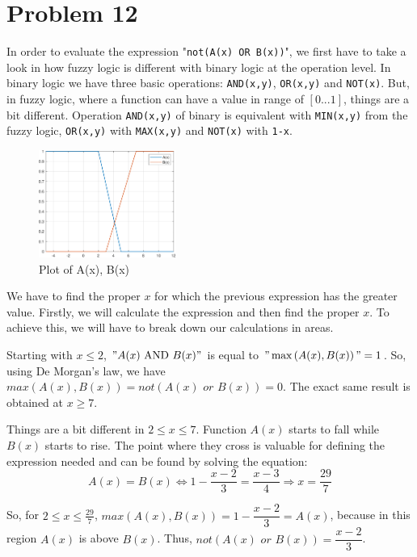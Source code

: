 \section{Problem 12}

In order to evaluate the expression "\verb|not(A(x) OR B(x))|", we first have to take a look in how fuzzy logic is different with binary logic at the operation level.
In binary logic we have three basic operations: \verb*|AND(x,y)|, \verb*|OR(x,y)| and \verb*|NOT(x)|. But, in fuzzy logic, where a function can have a value in range of $\left[0...1\right]$, things are a bit different.
Operation \verb*|AND(x,y)| of binary is equivalent with \verb|MIN(x,y)| from the fuzzy logic, \verb*|OR(x,y)| with \verb*|MAX(x,y)| and \verb*|NOT(x)| with \verb|1-x|.

\begin{figure}
	\centering
	\includegraphics[width=0.4\textwidth]{../Problem 12/a_b_functions.pdf}
	\caption{Plot of A(x), B(x)}
	\label{fig:prob_12_a_b}
\end{figure}

We have to find the proper $x$ for which the previous expression has the greater value. Firstly, we will calculate the expression and then find the proper $x$.
To achieve this, we will have to break down our calculations in areas. 

Starting with $x \le 2$, $"A(x) \text{ AND } B(x)"$ is equal to $"\max\left(A(x), B(x)\right)" = 1$. So, using De Morgan's law, we have $\textit{max}\left(A(x), B(x)\right) = \textit{not}\left(A(x) \textit{ or } B(x)\right) = 0$.
The exact same result is obtained at $x \ge 7$.

Things are a bit different in $2 \le x \le 7$. Function $A(x)$ starts to fall while $B(x)$ starts to rise. The point where they cross is valuable for defining the expression needed and can be found by solving the equation:
\[
A(x) = B(x) \Leftrightarrow 1 - \frac{x-2}{3} = \frac{x-3}{4} \Rightarrow x = \frac{29}{7}
\]

So, for $2 \le x \le \frac{29}{7}$, $\textit{max}\left(A(x), B(x)\right) = 1 - \dfrac{x-2}{3} = A(x)$, because in this region $A(x)$ is above $B(x)$. Thus, $\textit{not}\left(A(x) \textit{ or } B(x)\right) = \dfrac{x-2}{3}$.


